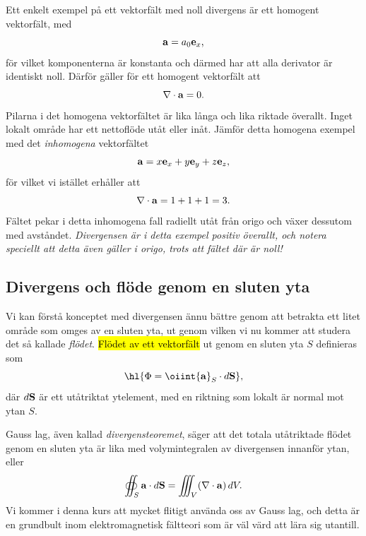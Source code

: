 \noindent
{}
\noindent
Ett enkelt exempel p{\aa} ett vektorf{\"a}lt med noll divergens {\"a}r ett
homogent vektorf{\"a}lt, med
$$
  {\bf a}=a_0{\bf e}_x,
$$
f{\"o}r vilket komponenterna {\"a}r konstanta och d{\"a}rmed har att alla
derivator {\"a}r identiskt noll. D{\"a}rf{\"o}r g{\"a}ller f{\"o}r ett homogent
vektorf{\"a}lt att
$$
  \nabla\cdot{\bf a}=0.
$$
Pilarna i det homogena vektorf{\"a}ltet {\"a}r lika l{\aa}nga och lika riktade
{\"o}verallt. Inget lokalt omr{\aa}de har ett nettofl{\"o}de ut{\aa}t eller
in{\aa}t.
\noindent
J{\"a}mf{\"o}r detta homogena exempel med det {\it inhomogena} vektorf{\"a}ltet
$$
  {\bf a}=x{\bf e}_x+y{\bf e}_y+z{\bf e}_z,
$$
f{\"o}r vilket vi ist{\"a}llet erh{\aa}ller att
$$
  \nabla\cdot{\bf a}=1+1+1=3.
$$
F{\"a}ltet pekar i detta inhomogena fall radiellt ut{\aa}t fr{\aa}n origo och
v{\"a}xer dessutom med avst{\aa}ndet. {\it Divergensen {\"a}r i detta exempel
positiv {\"o}verallt, och notera speciellt att detta {\"a}ven g{\"a}ller i
origo, trots att f{\"a}ltet d{\"a}r {\"a}r noll!}

\subsection{Divergens och fl{\"o}de genom en sluten yta}
Vi kan f{\"o}rst{\aa} konceptet med divergensen {\"a}nnu b{\"a}ttre genom att
betrakta ett litet omr{\aa}de som omges av en sluten yta, ut genom vilken vi
nu kommer att studera det s{\aa} kallade {\it fl{\"o}det}.
{\hl{Fl{\"o}det av ett vektorf{\"a}lt}} ut genom en sluten yta $S$ definieras
som
$$
  \hl{\Phi=\oiint{\bf a}_S\cdot d{\bf S}},
$$
d{\"a}r $d{\bf S}$ {\"a}r ett ut{\aa}triktat ytelement, med en riktning som
lokalt {\"a}r normal mot ytan $S$.

Gauss lag, {\"a}ven kallad {\it divergensteoremet}, s{\"a}ger att det totala
ut{\aa}triktade fl{\"o}det genom en sluten yta {\"a}r lika med volymintegralen
av divergensen innanf{\"o}r ytan, eller
$$
  \oiint_S{\bf a}\cdot d{\bf S}=\iiint_V(\nabla\cdot{\bf a})\,dV.
$$
Vi kommer i denna kurs att mycket flitigt anv{\"a}nda oss av Gauss lag, och
detta {\"a}r en grundbult inom elektromagnetisk f{\"a}ltteori som {\"a}r
v{\"a}l v{\"a}rd att l{\"a}ra sig utantill.

